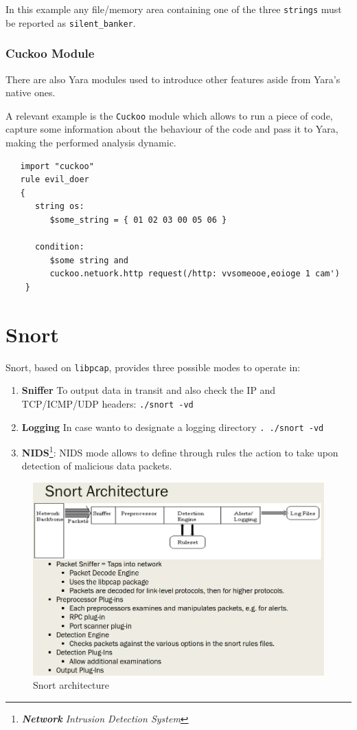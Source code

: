 In this example any file/memory area containing one of the three \texttt{strings} must be reported as \texttt{silent\_banker}.

\subsubsection{Cuckoo Module}
There are also Yara modules used to introduce other features aside from Yara's native ones.

A relevant example is the \texttt{Cuckoo} module which allows to run a piece of code, capture some information about the behaviour
of the code and pass it to Yara,
making the performed analysis dynamic.

\begin{lstlisting}
   import "cuckoo"
   rule evil_doer 
   {
      string os:
         $some_string = { 01 02 03 00 05 06 } 

      condition:
         $some string and 
         cuckoo.netuork.http request(/http: vvsomeooe,eoioge 1 cam') 
    }
\end{lstlisting}

\section{Snort}
Snort, based on \texttt{libpcap}, provides three possible modes to operate in:
\begin{enumerate}
   \item \textbf{Sniffer}
   To output data in transit and also check the IP and TCP/ICMP/UDP headers:
   \lstinline|./snort -vd|
   \item \textbf{Logging}
   In case wanto to designate a logging directory \lstinline|. ./snort -vd|
   \item \textbf{NIDS}\footnote{\textit{\textbf{Network} Intrusion Detection System}}:
   NIDS mode allows to define through rules the action to take upon detection of
   malicious data packets.
\end{enumerate}

\begin{figure}[htbp]
   \centering
   \includegraphics{images/snort_architecture.png}
   \caption{Snort architecture}
   \label{fig:snort_architecture}
\end{figure}

